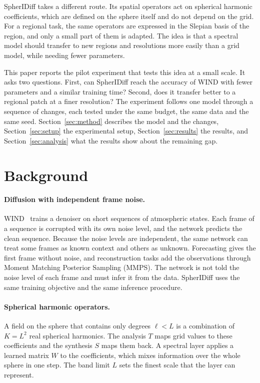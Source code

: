 \documentclass{article}
\begin{document}
SpherIDiff takes a different route. Its spatial operators act on spherical harmonic coefficients, which are defined on the sphere itself and do not depend on the grid. For a regional task, the same operators are expressed in the Slepian basis of the region, and only a small part of them is adapted. The idea is that a spectral model should transfer to new regions and resolutions more easily than a grid model, while needing fewer parameters.

This paper reports the pilot experiment that tests this idea at a small scale. It asks two questions. First, can SpherIDiff reach the accuracy of WIND with fewer parameters and a similar training time? Second, does it transfer better to a regional patch at a finer resolution? The experiment follows one model through a sequence of changes, each tested under the same budget, the same data and the same seed. Section~\ref{sec:method} describes the model and the changes, Section~\ref{sec:setup} the experimental setup, Section~\ref{sec:results} the results, and Section~\ref{sec:analysis} what the results show about the remaining gap.

\section{Background}
\label{sec:background}

\paragraph{Diffusion with independent frame noise.}
WIND~\citep{aich2026wind} trains a denoiser on short sequences of atmospheric states. Each frame of a sequence is corrupted with its own noise level, and the network predicts the clean sequence. Because the noise levels are independent, the same network can treat some frames as known context and others as unknown. Forecasting gives the first frame without noise, and reconstruction tasks add the observations through Moment Matching Posterior Sampling (MMPS). The network is not told the noise level of each frame and must infer it from the data. SpherIDiff uses the same training objective and the same inference procedure.

\paragraph{Spherical harmonic operators.}
A field on the sphere that contains only degrees $\ell<L$ is a combination of $K=L^2$ real spherical harmonics. The analysis $T$ maps grid values to these coefficients and the synthesis $S$ maps them back. A spectral layer applies a learned matrix $W$ to the coefficients, which mixes information over the whole sphere in one step. The band limit $L$ sets the finest scale that the layer can represent.
\end{document}
